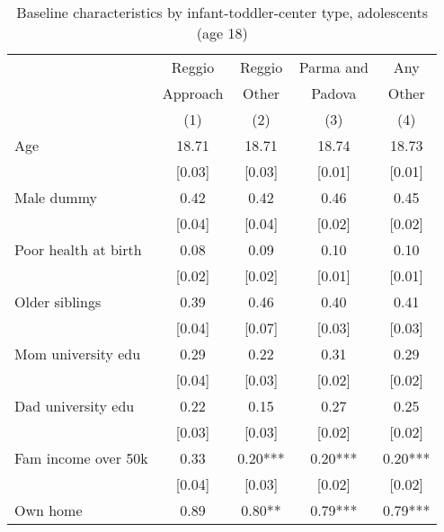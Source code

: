 \begin{table}[H]
\caption{Baseline characteristics by infant-toddler-center type, adolescents (age 18)}
\label{tab:adol_CONTROLasilo}
\centering
\begin{adjustbox}{max height=\dimexpr\textheight-5.5cm\relax,max width=\textwidth}
\small
\begin{tabular}{l cccc}
\hline \hline 
 & Reggio & Reggio & Parma and & Any \\
 & Approach & Other & Padova & Other \\
 &   (1)    &  (2)  & (3)    &  (4) \\
\hline 

Age   &   18.71   &   18.71   &   18.74   &   18.73 \\ 
   &   [0.03]   &   [0.03]   &   [0.01]   &   [0.01] \\ 
Male dummy   &   0.42   &   0.42   &   0.46   &   0.45 \\ 
   &   [0.04]   &   [0.04]   &   [0.02]   &   [0.02] \\ 
Poor health at birth   &   0.08   &   0.09   &   0.10   &   0.10 \\ 
   &   [0.02]   &   [0.02]   &   [0.01]   &   [0.01] \\ 
Older siblings   &   0.39   &   0.46   &   0.40   &   0.41 \\ 
   &   [0.04]   &   [0.07]   &   [0.03]   &   [0.03] \\ 
Mom university edu   &   0.29   &   0.22   &   0.31   &   0.29 \\ 
   &   [0.04]   &   [0.03]   &   [0.02]   &   [0.02] \\ 
Dad university edu   &   0.22   &   0.15   &   0.27   &   0.25 \\ 
   &   [0.03]   &   [0.03]   &   [0.02]   &   [0.02] \\ 
Fam income over 50k   &   0.33   &   0.20***   &   0.20***   &   0.20*** \\ 
   &   [0.04]   &   [0.03]   &   [0.02]   &   [0.02] \\ 
Own home   &   0.89   &   0.80**   &   0.79***   &   0.79*** \\ 

\end{tabular}
\end{adjustbox}
\end{table}
